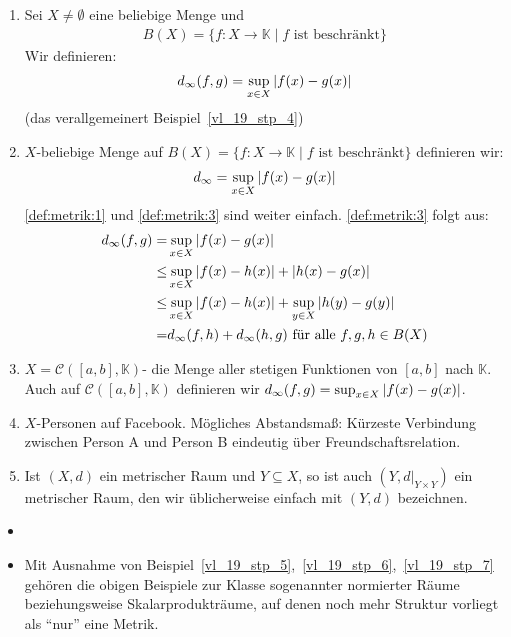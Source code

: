\begin{Beispiel}
{\begin{enumerate}
		\item Sei $X \neq \emptyset$ eine beliebige Menge und 
		\begin{align*}
			B(X) = \{f: X \rightarrow \mathbb{K}\mid f \text{ ist beschränkt}\}
		\end{align*}
		Wir definieren:
		\begin{align*}
			d_\infty (f,g) = \sup_{x \in X} \abs{f(x)- g(x)}
		\end{align*}
		(das verallgemeinert Beispiel~\ref{vl_19_stp_4})
		\item $X$-beliebige Menge auf $B(X) =\{f: X \rightarrow \mathbb{K}\mid f 
		\text{ ist beschränkt}\}$ definieren wir:
		\begin{align*}
			d_\infty = \sup_{x \in X} \abs{f(x) -g(x)}
		\end{align*}
		\ref{def:metrik:1} und \ref{def:metrik:3} sind weiter einfach. 
		\ref{def:metrik:3} folgt aus: 
		\begin{align*}
			d_\infty (f,g) = & \sup_{x \in X} \abs{ f(x) -g(x)} \\
			\leq &\sup_{x \in X} \abs{f(x)-h(x)}+\abs{h(x)-g(x)}  \\
			\leq &  \sup_{x \in X}\abs{f(x)-h(x)} + \sup_{y \in X}\abs{h(y)-g(y)} \\
			= & d_\infty (f,h) + d_\infty (h,g) \text{ für alle } f,g,h \in B(X) 
		\end{align*}
		\item $X = \mathcal{C}([a,b], \mathbb{K})$- die Menge aller stetigen Funktionen 
		von $[a,b]$ nach $\mathbb{K}$. Auch auf $\mathcal{C}([a,b], \mathbb{K})$ 
		definieren wir $d_\infty(f,g) = \sup_{x \in X} \abs{f(x)-g(x)}$.
		\item \label{vl_19_stp_6}  $X$-Personen auf Facebook.
		Mögliches Abstandsmaß: Kürzeste Verbindung zwischen Person A und Person B eindeutig 
		über Freundschaftsrelation. 
		\item \label{vl_19_stp_7} Ist $(X,d)$ ein metrischer Raum und $Y \subseteq X$, so ist auch 
		$(Y, d\vert_{Y \times Y})$ ein metrischer Raum, den wir üblicherweise einfach 
		mit $(Y,d)$ bezeichnen.
	\end{enumerate}
}\end{Beispiel}

\begin{Bemerkung}{
	\begin{itemize}
		\item[ ]
		\item Mit Ausnahme von Beispiel~\ref{vl_19_stp_5},~\ref{vl_19_stp_6},~\ref{vl_19_stp_7} gehören die obigen Beispiele zur 
		Klasse sogenannter normierter Räume beziehungsweise Skalarprodukträume, 
		auf denen noch mehr Struktur vorliegt als \enquote{nur} eine Metrik.
	\end{itemize}
}\end{Bemerkung}